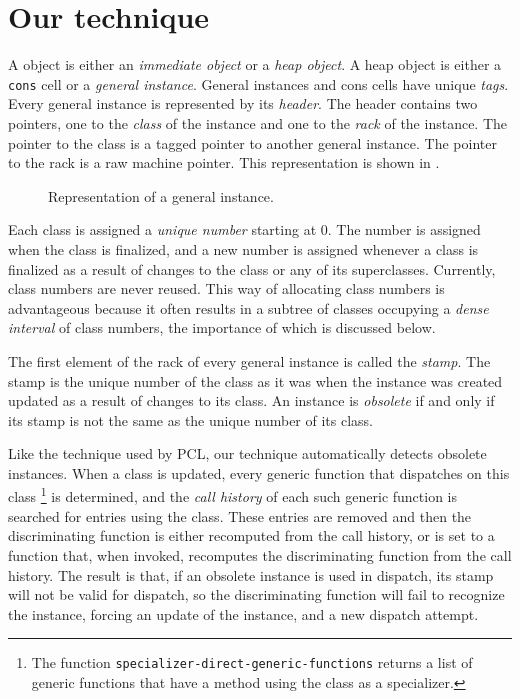 \section{Our technique}

A \sicl{} object is either an \emph{immediate object} or a \emph{heap
  object}.  A heap object is either a \texttt{cons} cell or a
\emph{general instance}.  General instances and cons cells have unique
\emph{tags}.  Every general instance is represented by its
\emph{header}.  The header contains two pointers, one to the
\emph{class} of the instance and one to the \emph{rack} of the
instance.  The pointer to the class is a tagged pointer to another
general instance.  The pointer to the rack is a raw machine pointer.
This representation is shown in .

\begin{figure}
\begin{center}
\end{center}
\caption{\label{fig-general-instance}
Representation of a general instance.}
\end{figure}

Each class is assigned a \emph{unique number} starting at $0$.  The
number is assigned when the class is finalized, and a new number is
assigned whenever a class is finalized as a result of changes to the
class or any of its superclasses.  Currently, class numbers are never
reused.  This way of allocating class numbers is advantageous because
it often results in a subtree of classes occupying a \emph{dense
  interval} of class numbers, the importance of which is discussed
below. 

The first element of the rack of every general instance is called the
\emph{stamp}.  The stamp is the unique number of the class as it was
when the instance was created updated as a result of changes to its
class.  An instance is \emph{obsolete} if and only if its stamp is not
the same as the unique number of its class.

Like the technique used by PCL, our technique automatically detects
obsolete instances.  When a class is updated, every generic function
that dispatches on this class%
\footnote{The function
  \texttt{specializer-direct-generic-functions} returns a list of
  generic functions that have a method using the class as a specializer.}
is determined, and the \emph{call history} of each such generic
function is searched for entries using the class.  These entries are
removed and then the discriminating function is either recomputed from
the call history, or is set to a function that, when invoked,
recomputes the discriminating function from the call history.   The
result is that, if an obsolete instance is used in dispatch, its stamp
will not be valid for dispatch, so the discriminating function will
fail to recognize the instance, forcing an update of the instance, and
a new dispatch attempt. 

